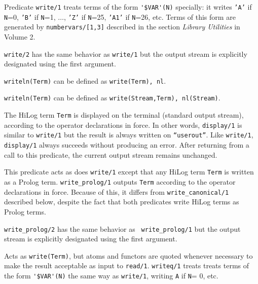 \begin{description}
    Predicate {\tt write/1} treats terms of the form 
    \verb|'$VAR'(N)| specially:  it writes {\tt 'A'} if {\tt N}=0,
    {\tt 'B'} if {\tt N}=1, $\ldots$, {\tt 'Z'} if {\tt N}=25, {\tt 'A1'} 
    if {\tt N}=26, etc.  Terms of this form are generated by
    {\tt numbervars/[1,3]} described in the section {\it Library Utilities} in Volume 2.

	{\tt write/2} has the same behavior as {\tt write/1} but the
	output stream is explicitly designated using the first argument.

    {\tt writeln(Term)} can be defined as {\tt write(Term), nl}.

    {\tt writeln(Term)} can be defined as {\tt write(Stream,Term),
    nl(Stream)}.

    The HiLog term {\tt Term} is displayed on the terminal (standard output 
    stream), according to the operator declarations in force. In other words,
    {\tt display/1} is similar to {\tt write/1} but the result is always
    written on {\tt ``userout''}\@.  Like {\tt write/1}, {\tt display/1} 
    always succeeds without producing an error. After returning from a call 
    to this predicate, the current output stream remains unchanged.

    This predicate acts as does {\tt write/1} except that
    any HiLog term {\tt Term} is written as a Prolog term. 
    {\tt write\_prolog/1} outputs {\tt Term} according to the operator 
    declarations
    in force.  Because of this, it differs from {\tt write\_canonical/1} 
    described below, despite the fact that both predicates write HiLog terms
    as Prolog terms.

	{\tt write\_prolog/2} has the same behavior as {\tt
	write\_prolog/1} but the output stream is explicitly
	designated using the first argument.

    Acts as {\tt write(Term)}, but atoms and functors are quoted
    whenever necessary to make the result acceptable as input to 
    {\tt read/1}\@. {\tt writeq/1} treats treats terms of the form 
    \verb|'$VAR'(N)| the same way as {\tt write/1}, writing {\tt A} if
    {\tt N}= 0, etc. 


\end{description}
